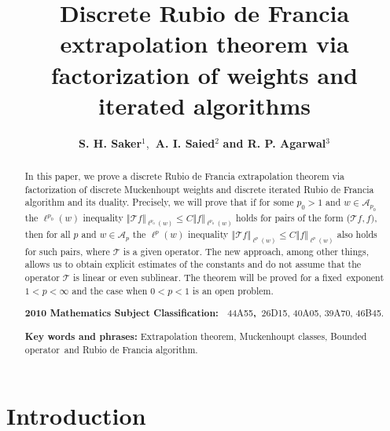 \documentclass[a4paper]{amsart}
\theoremstyle{plain}
\numberwithin{equation}{section}
\begin{document}
\title[Discrete extrapolation theorem]{Discrete Rubio de Francia
extrapolation theorem via factorization of weights and iterated algorithms}
\author{\textbf{S. H. Saker}$^{1}$,\textbf{\ A. I. Saied}$^{2}$ \textbf{and
R. P. Agarwal}$^{3}$}
\address{$^{1}$Department of Mathematics, Faculty of Science, Mansoura
University, Mansoura-Egypt, e-mail: shsaker@mans.edu.eg\\
$^{2}$Department of Mathematics, Faculty of Science,\ Benha university,
Benha- Egypt, e-mail: as0863289@gmail.com\\
$^{3}$Department of Mathematics, Texas A \& M University- Kingsvilie, \\
Texas, 78363, USA.\\
E-mail: Ravi.Agarwal@tamuk.edu}
\maketitle

\begin{abstract}
In this paper, we prove a discrete Rubio de Francia extrapolation theorem
via factorization of discrete Muckenhoupt weights and discrete iterated
Rubio de Francia algorithm and its duality. Precisely, we will prove that if
for some $p_{0}>1$ and $w\in \mathcal{A}_{p_{0}}$ the $\ell ^{p_{0}}(w)$
inequality $\left\Vert \mathcal{T}f\right\Vert _{\ell ^{p_{0}}(w)}\leq
C\left\Vert f\right\Vert _{\ell ^{p_{0}}(w)}$ holds for pairs of the form ($%
\mathcal{T}f,f)$, then for all $p$ and $w\in \mathcal{A}_{p}$ the $\ell
^{p}(w)$ inequality $\left\Vert \mathcal{T}f\right\Vert _{\ell ^{p}(w)}\leq
C\left\Vert f\right\Vert _{\ell ^{p}(w)}$ also holds for such pairs, where $%
\mathcal{T}$ is a given operator. The new approach, among other things,
allows us to obtain explicit estimates of the constants and do not assume
that the operator $\mathcal{T}$ is linear or even sublinear. The theorem
will be proved for a fixed\ exponent $1<p<\infty $ and the case when $0<p<1$
is an open problem.

\bigskip

\textbf{2010 Mathematics Subject Classification: \ }44A55\textbf{,\ }26D15,
40A05, 39A70, 46B45.

\bigskip

\textbf{Key words and phrases: }Extrapolation theorem, Muckenhoupt classes,
Bounded operator\ and Rubio de Francia algorithm.
\end{abstract}

\section{Introduction}
\end{document}
